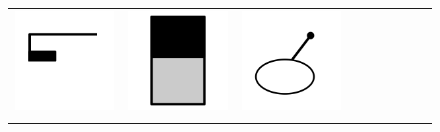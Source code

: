 \documentclass[doc]{apa6}
\newcommand{\stimulusscale}{.1}
\begin{document}
\begin{figure}[t]
\begin{center}
\begin{tabular}{c|cccccccc}
\includegraphics[scale=\stimulusscale]{./set26stim55.png} &
\includegraphics[scale=\stimulusscale]{./set27stim55.png} &
\includegraphics[scale=\stimulusscale]{./set28stim55.png}\\[6pt]
 \raisebox{.75cm}{75}  &

\end{tabular}
\end{center}
\end{figure}
\end{document}
